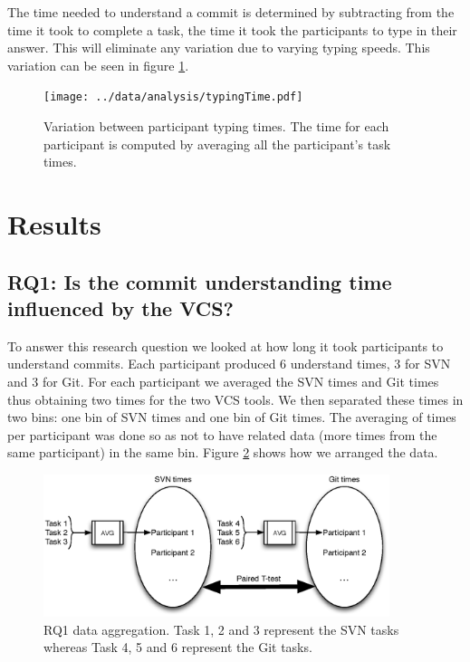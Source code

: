 \documentclass[letterpaper]{article}
\begin{document}
The time needed to understand a commit is determined by subtracting from the time it took to complete a task, the time it took the participants to type in their answer.
This will eliminate any variation due to varying typing speeds.
This variation can be seen in figure \ref{fig:typingTimes}.

\begin{figure}[H]
    \centering
    \texttt{[image: ../data/analysis/typingTime.pdf]}
    \caption{Variation between participant typing times. The time for each participant is computed by averaging all the participant's task times.}
    \label{fig:typingTimes}
\end{figure}

\section{Results}

\subsection{RQ1: Is the commit understanding time influenced by the VCS?}

To answer this research question we looked at how long it took participants to understand commits.
Each participant produced 6 understand times, 3 for SVN and 3 for Git.
For each participant we averaged the SVN times and Git times thus obtaining two times for the two VCS tools.
We then separated these times in two bins: one bin of SVN times and one bin of Git times. 
The averaging of times per participant was done so as not to have related data (more times from the same participant) in the same bin.
Figure \ref{fig:rq1-data} shows how we arranged the data.

\begin{figure}[H]
    \centering
    \includegraphics[width=0.9\textwidth]{fig/RQ1-data}
    \caption{RQ1 data aggregation. Task 1, 2 and 3 represent the SVN tasks whereas Task 4, 5 and 6 represent the Git tasks.}
    \label{fig:rq1-data}
\end{figure}
\end{document}
